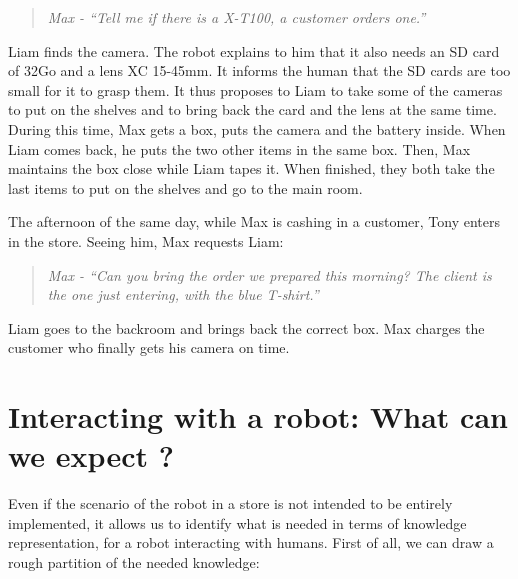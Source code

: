\begin{quote} 
\centering 
\textit{
Max - ``Tell me if there is a X-T100, a customer orders one.''}
\end{quote}

Liam finds the camera. The robot explains to him that it also needs an SD card of 32Go and a lens XC 15-45mm. It informs the human that the SD cards are too small for it to grasp them. It thus proposes to Liam to take some of the cameras to put on the shelves and to bring back the card and the lens at the same time. During this time, Max gets a box, puts the camera and the battery inside. When Liam comes back, he puts the two other items in the same box. Then, Max maintains the box close while Liam tapes it. When finished, they both take the last items to put on the shelves and go to the main room.

The afternoon of the same day, while Max is cashing in a customer, Tony enters in the store. Seeing him, Max requests Liam:

\begin{quote} 
\centering 
\textit{
Max - ``Can you bring the order we prepared this morning? The client is the one just entering, with the blue T-shirt.''}
\end{quote}

Liam goes to the backroom and brings back the correct box. Max charges the customer who finally gets his camera on time.

\section{Interacting with a robot: What can we expect ?}

Even if the scenario of the robot in a store is not intended to be entirely implemented, it allows us to identify what is needed in terms of knowledge representation, for a robot interacting with humans. First of all, we can draw a rough partition of the needed knowledge:

